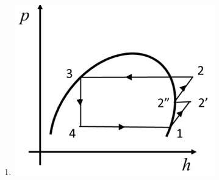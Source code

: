 \documentclass[journal]{IEEEtran}
\theoremstyle{remark}
\begin{document}
\begin{enumerate}[itemsep=1em]
\begin{multicols}{4}
\begin{enumerate}
    \item \begin{minipage}[t]{0.2\textwidth}
    \vspace{0pt}
        \includegraphics[width=\columnwidth]{figs/fig-14.jpeg}
    \label{fig-14}
    \end{minipage}
\end{enumerate}
\end{multicols}
\end{enumerate}
\end{document}
